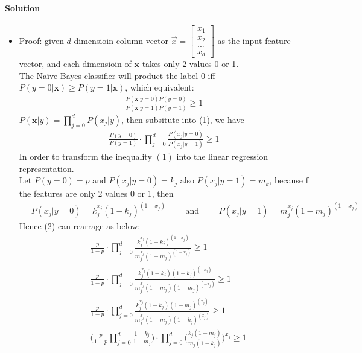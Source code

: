 \documentclass[a4paper]{scrartcl}
\begin{document}
\paragraph{Solution}
\begin{itemize}
  \item Proof: given $d$-dimensioin column vector
$\vec{x}= \begin{bmatrix} x_1 \\ x_2 \\ ... \\ x_d \end{bmatrix}$ as the input feature vector, and each dimensioin of $\textbf{x}$ takes only 2 values 0 or 1.\\
The Na\"ive Bayes classifier will product the label 0 iff $P(y=0|\textbf{x}) \geq P(y=1|\textbf{x})$, which equivalent:
\begin{align}
  \frac{P(\textbf{x}|y=0)P(y=0)}{P(\textbf{x}|y=1)P(y=1)} \geq 1
\end{align}
 ${\displaystyle P(\textbf{x}|y)=\prod_{j=0}^{d} P(x_j|y)}$, then subsitute into (1), we have
\begin{align}
\frac{P(y=0)}{P(y=1)} \cdot {\displaystyle \prod_{j=0}^{d}} \frac{P(x_j|y=0)}{P(x_j|y=1)} \geq 1
\end{align}
In order to transform the inequality $(1)$ into the linear regression representation.\\
Let $P(y=0)=p$ and $P(x_j|y=0)=k_j$ also $P(x_j|y=1)=m_k$, because f the features are only 2 values 0 or 1, then
\begin{align*}
  &\ P(x_j|y=0)= k_j^{x_j}(1-k_j)^{(1-x_j)}\qquad \text{ and }\qquad P(x_j|y=1)= m_j^{x_j}(1-m_j)^{(1-x_j)}
\end{align*}
Hence (2) can rearrage as below:
\begin{align*}
 &\ \frac{p}{1-p} \cdot {\displaystyle \prod_{j=0}^{d}} \frac{k_j^{x_j}(1-k_j)^{(1-x_j)}}{m_j^{x_j}(1-m_j)^{(1-x_j)}} \geq 1\\
 &\ \frac{p}{1-p} \cdot {\displaystyle \prod_{j=0}^{d}} \frac{k_j^{x_j}(1-k_j)(1-k_j)^{(-x_j)}}{m_j^{x_j}(1-m_j)(1-m_j)^{(-x_j)}} \geq 1\\
 &\ \frac{p}{1-p} \cdot {\displaystyle \prod_{j=0}^{d}} \frac{k_j^{x_j}(1-k_j)(1-m_j)^{(x_j)}}{m_j^{x_j}(1-m_j)(1-k_j)^{(x_j)}} \geq 1\\
 &\ \Bigg(\frac{p}{1-p} {\displaystyle \prod_{j=0}^{d}} \frac{1-k_j}{1-m_j}\Bigg) \cdot {\displaystyle \prod_{j=0}^{d}} \Bigg(\frac{k_j(1-m_j)}{m_j(1-k_j)}\Bigg)^{x_j} \geq 1
\end{align*}

\end{itemize}
\end{document}
